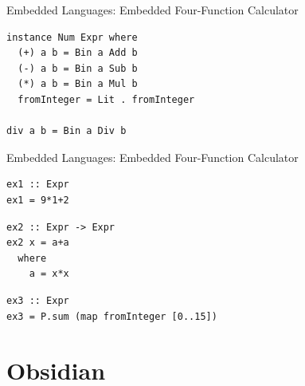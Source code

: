 \documentclass[xcolor=dvipsnames]{beamer}
\begin{document}
%
\begin{frame}[fragile]{Embedded Languages: {\small Embedded Four-Function Calculator}} 

\begin{block}{}
\begin{verbatim} 
instance Num Expr where
  (+) a b = Bin a Add b 
  (-) a b = Bin a Sub b
  (*) a b = Bin a Mul b 
  fromInteger = Lit . fromInteger

div a b = Bin a Div b 
\end{verbatim}  
\end{block} 

\end{frame} 

%
\begin{frame}[fragile]{Embedded Languages: {\small Embedded Four-Function Calculator}} 

\begin{block}{}
\begin{verbatim} 
ex1 :: Expr
ex1 = 9*1+2
\end{verbatim}  
\end{block} 

\pause
\begin{block}{}
\begin{verbatim} 
ex2 :: Expr -> Expr
ex2 x = a+a 
  where
    a = x*x
\end{verbatim}  
\end{block} 

\pause
\begin{block}{}
\begin{verbatim} 
ex3 :: Expr
ex3 = P.sum (map fromInteger [0..15])
\end{verbatim}  
\end{block} 

\end{frame} 


%
\section{Obsidian}
\end{document}
